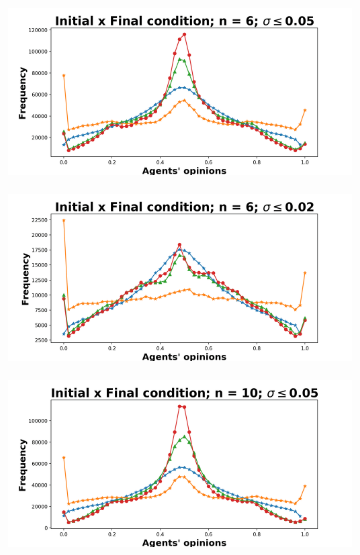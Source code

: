 \documentclass{article}
\begin{document}
{\begin{figure}[H]
    \begin{subfigure}[b]{0.49\textwidth}
      \includegraphics[width=\textwidth]{img/oiks/oiks_smallsigma005_n6.png}
    \end{subfigure}
    \begin{subfigure}[b]{0.49\textwidth}
      \includegraphics[width=\textwidth]{img/oiks/oiks_smallsigma002_n6.png}
    \end{subfigure}
     \begin{subfigure}[b]{0.49\textwidth}
       \includegraphics[width=\textwidth]{img/oiks/oiks_smallsigma005_n10.png}

\end{subfigure}
\end{figure}}
\end{document}

